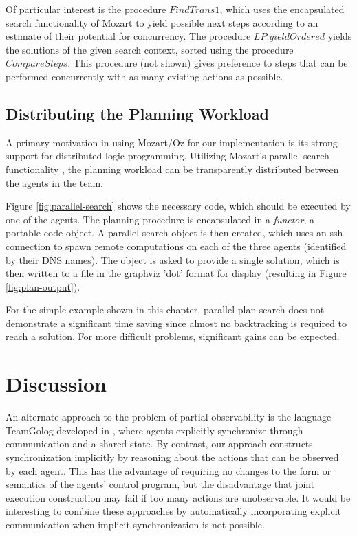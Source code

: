 Of particular interest is the procedure $FindTrans1$, which uses
the encapsulated search functionality of Mozart to yield possible
next steps according to an estimate of their potential for concurrency.
The procedure $LP.yieldOrdered$ yields the solutions of the given
search context, sorted using the procedure $CompareSteps$. This procedure
(not shown) gives preference to steps that can be performed concurrently
with as many existing actions as possible.


\subsection{Distributing the Planning Workload}

A primary motivation in using Mozart/Oz for our implementation is
its strong support for distributed logic programming. Utilizing Mozart's
parallel search functionality \citep{Schulte00constraint_services},
the planning workload can be transparently distributed between the
agents in the team.

Figure \ref{fig:parallel-search} shows the necessary code, which
should be executed by one of the agents. The planning procedure is
encapsulated in a \emph{functor}, a portable code object. A parallel
search object is then created, which uses an ssh connection to spawn
remote computations on each of the three agents (identified by their
DNS names). The object is asked to provide a single solution, which
is then written to a file in the graphviz 'dot' format for display
(resulting in Figure \ref{fig:plan-output}).

For the simple example shown in this chapter, parallel plan search
does not demonstrate a significant time saving since almost no backtracking
is required to reach a solution. For more difficult problems, significant
gains can be expected.


\section{Discussion\label{sec:JointExec:Discussion}}

An alternate approach to the problem of partial observability is the
language TeamGolog developed in \citep{farinelli07team_golog}, where
agents explicitly synchronize through communication and a shared state.
By contrast, our approach constructs synchronization implicitly by
reasoning about the actions that can be observed by each agent. This
has the advantage of requiring no changes to the form or semantics
of the agents' control program, but the disadvantage that joint execution
construction may fail if too many actions are unobservable. It would
be interesting to combine these approaches by automatically incorporating
explicit communication when implicit synchronization is not possible.

